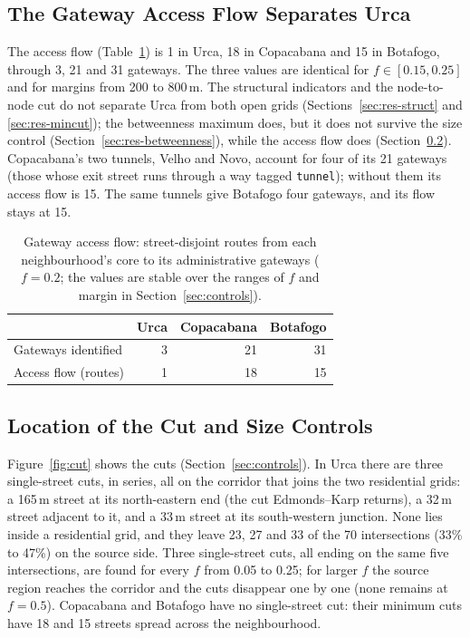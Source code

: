 \documentclass[runningheads]{llncs}
\begin{document}
\subsection{The Gateway Access Flow Separates Urca}
\label{sec:res-access}

The access flow (Table~\ref{tab:acesso}) is 1 in Urca, 18 in Copacabana and 15
in Botafogo, through 3, 21 and 31 gateways. The three values are identical for
$f \in [0.15,0.25]$ and for margins from 200 to 800\,m. The structural
indicators and the node-to-node cut do not separate Urca from both open grids
(Sections~\ref{sec:res-struct} and \ref{sec:res-mincut}); the betweenness
maximum does, but it does not survive the size control
(Section~\ref{sec:res-betweenness}), while the access flow does
(Section~\ref{sec:res-cut}). Copacabana's two tunnels, Velho and Novo, account
for four of its 21 gateways (those whose exit street runs through a way tagged
\texttt{tunnel}); without them its access flow is 15. The same tunnels give
Botafogo four gateways, and its flow stays at 15.

\begin{table}[t]
\centering
\caption{Gateway access flow: street-disjoint routes from each
neighbourhood's core to its administrative gateways ($f=0.2$; the values
are stable over the ranges of $f$ and margin in Section~\ref{sec:controls}).}
\label{tab:acesso}
\begin{tabular}{lrrr}
\toprule
 & Urca & Copacabana & Botafogo \\
\midrule
Gateways identified              & 3    & 21             & 31 \\
Access flow (routes)             & 1    & 18             & 15 \\
\bottomrule
\end{tabular}
\end{table}

\subsection{Location of the Cut and Size Controls}
\label{sec:res-cut}

Figure~\ref{fig:cut} shows the cuts (Section~\ref{sec:controls}). In Urca there
are three single-street cuts, in series, all on the corridor that joins the two
residential grids: a 165\,m street at its north-eastern end (the cut
Edmonds--Karp returns), a 32\,m street adjacent to it, and a 33\,m street at its
south-western junction. None lies inside a residential grid, and they leave 23,
27 and 33 of the 70 intersections (33\% to 47\%) on the source side. Three
single-street cuts, all ending on the same five intersections, are found for
every $f$ from 0.05 to 0.25; for larger $f$ the source region reaches the
corridor and the cuts disappear one by one (none remains at $f=0.5$).
Copacabana and Botafogo have no single-street cut: their minimum cuts have 18
and 15 streets spread across the neighbourhood.
\end{document}

